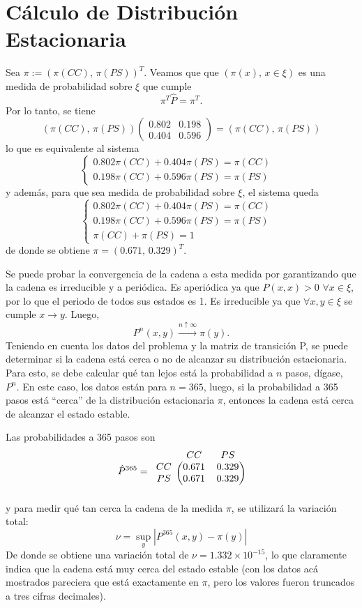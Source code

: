 \section{Cálculo de Distribución Estacionaria \boldmath{$\pi$}}\label{sec:pi}

Sea $\pi:=(\pi(CC),\,\pi(PS))^T$. Veamos que que $(\pi(x),\,x\in\xi)$ es una medida de probabilidad sobre $\xi$ que cumple \[\pi^T\hat{P}=\pi^T.\]
Por lo tanto, se tiene
\[
(\pi(CC),\,\pi(PS))
\begin{pmatrix}
0.802 & 0.198 \\
0.404 & 0.596
\end{pmatrix}
=(\pi(CC),\,\pi(PS))
\]
lo que es equivalente al sistema 
\[
\begin{cases}
0.802\pi(CC)+0.404\pi(PS)=\pi(CC)&\\
0.198\pi(CC)+0.596\pi(PS)=\pi(PS)&
\end{cases}
\]
y además, para que sea medida de probabilidad sobre $\xi$, el sistema queda
\[
\begin{cases}
0.802\pi(CC)+0.404\pi(PS)=\pi(CC)&\\
0.198\pi(CC)+0.596\pi(PS)=\pi(PS)&\\
\pi(CC)+\pi(PS)=1
\end{cases}
\]
de donde se obtiene $\pi=(0.671,\,0.329)^T$.

Se puede probar la convergencia de la cadena a esta medida por garantizando que la cadena es irreducible y a periódica. Es aperiódica ya que $P(x,x)>0$ $\forall x\in\xi$, por lo que el periodo de todos sus estados es 1. Es irreducible ya que $\forall x,y\in\xi$ se cumple $x\rightarrow y$. Luego,
\[
P^n(x,y)\xrightarrow{n\uparrow\infty}\pi(y).
\]
Teniendo en cuenta los datos del problema y la matriz de transición P, se puede determinar si la cadena está cerca o no de alcanzar su distribución estacionaria. Para esto, se debe calcular qué tan lejos está la probabilidad a $n$ pasos, dígase, $P^n$. En este caso, los datos están para $n=365$, luego, si la probabilidad a 365 pasos está ``cerca'' de la distribución estacionaria $\pi$, entonces la cadena está cerca de alcanzar el estado estable.

Las probabilidades a 365 pasos son
\[
\hat{P}^{365}=\begin{blockarray}{ccc}
& CC & PS \\
\begin{block}{c(cc)}
  CC & 0.671 & 0.329 \\
  PS & 0.671 & 0.329 \\
\end{block}
\end{blockarray}
\]
y para medir qué tan cerca la cadena de la medida $\pi$, se utilizará la variación total:
\[
\nu=\sup_y|P^{365}(x,y)-\pi(y)|
\]
De donde se obtiene una variación total de $\nu=1.332\times10^{-15}$, lo que claramente indica que la cadena está muy cerca del estado estable (con los datos acá mostrados pareciera que está exactamente en $\pi$, pero los valores fueron truncados a tres cifras decimales).

